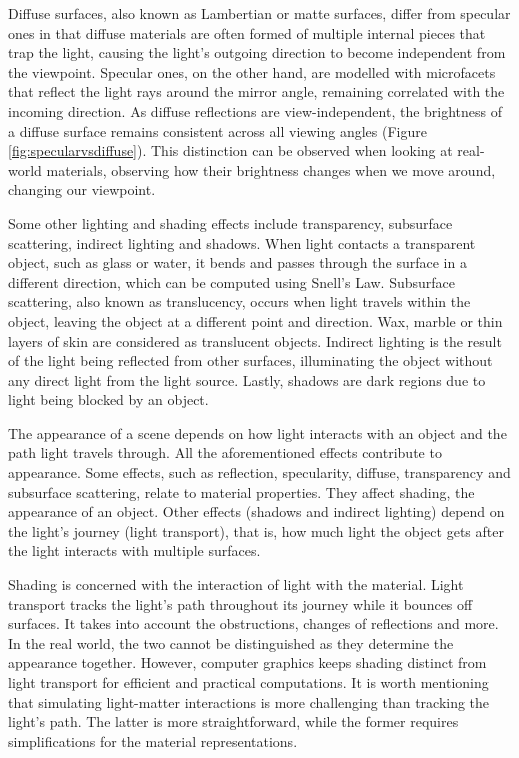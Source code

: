 Diffuse surfaces, also known as Lambertian or matte surfaces, differ from specular ones in that diffuse materials are often formed of multiple internal pieces that trap the light, causing the light's outgoing direction to become independent from the viewpoint. Specular ones, on the other hand, are modelled with microfacets that reflect the light rays around the mirror angle, remaining correlated with the incoming direction. As diffuse reflections are view-independent, the brightness of a diffuse surface remains consistent across all viewing angles (Figure \ref{fig:specularvsdiffuse}). This distinction can be observed when looking at real-world materials, observing how their brightness changes when we move around, changing our viewpoint.


Some other lighting and shading effects include transparency, subsurface scattering, indirect lighting and shadows. When light contacts a transparent object, such as glass or water, it bends and passes through the surface in a different direction, which can be computed using Snell's Law. Subsurface scattering, also known as translucency, occurs when light travels within the object, leaving the object at a different point and direction. Wax, marble or thin layers of skin are considered as translucent objects. Indirect lighting is the result of the light being reflected from other surfaces, illuminating the object without any direct light from the light source. Lastly, shadows are dark regions due to light being blocked by an object. 

The appearance of a scene depends on how light interacts with an object and the path light travels through. All the aforementioned effects contribute to appearance. Some effects, such as reflection, specularity, diffuse, transparency and subsurface scattering, relate to material properties. They affect shading, the appearance of an object. Other effects (shadows and indirect lighting) depend on the light's journey (light transport), that is, how much light the object gets after the light interacts with multiple surfaces. 

Shading is concerned with the interaction of light with the material. Light transport tracks the light's path throughout its journey while it bounces off surfaces. It takes into account the obstructions, changes of reflections and more. In the real world, the two cannot be distinguished as they determine the appearance together. However, computer graphics keeps shading distinct from light transport for efficient and practical computations. It is worth mentioning that simulating light-matter interactions is more challenging than tracking the light's path. The latter is more straightforward, while the former requires simplifications for the material representations.



